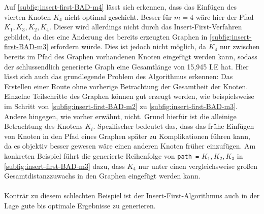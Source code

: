 Auf \vref{subfig:insert-first-BAD-m4} lässt sich erkennen, dass das Einfügen des vierten Knoten $K_4$ nicht optimal geschieht. 
Besser für $m = 4$ wäre hier der Pfad $K_1, K_3, K_2, K_4$. 
Dieser wird allerdings nicht durch das Insert-First-Verfahren gebildet, da dies eine Änderung des bereits erzeugten Graphen in \vref{subfig:insert-first-BAD-m3} erfordern würde. 
Dies ist jedoch nicht möglich, da $K_4$ nur zwischen bereits im Pfad des Graphen vorhandenen Knoten eingefügt werden kann, sodass der schlussendlich generierte Graph eine Gesamtlänge von 15,945 \ac{LE} hat.
Hier lässt sich auch das grundlegende Problem des Algorithmus erkennen: Das Erstellen einer Route ohne vorherige Betrachtung der Gesamtheit der Knoten. 
Einzelne Teilschritte des Graphen können gut erzeugt werden, wie beispielsweise im Schritt von \vref{subfig:insert-first-BAD-m2} zu \vref{subfig:insert-first-BAD-m3}. 
Andere hingegen, wie vorher erwähnt, nicht. 
Grund hierfür ist die alleinige Betrachtung des Knotens $K_i$. 
Spezifischer bedeutet das, dass das frühe Einfügen von Knoten in den Pfad eines Graphen später zu Komplikationen führen kann, da es objektiv besser gewesen wäre einen anderen Knoten früher einzufügen.
Am konkreten Beispiel führt die generierte Reihenfolge von \lstinline{path =} $K_1, K_2, K_3$ in \vref{subfig:insert-first-BAD-m3} dazu, dass $K_4$ nur unter einen vergleichsweise großen Gesamtdistanzzuwachs in den Graphen eingefügt werden kann. 
\\\\
Konträr zu diesem schlechten Beispiel ist der Insert-First-Algorithmus auch in der Lage gute bis optimale Ergebnisse zu generieren. 


